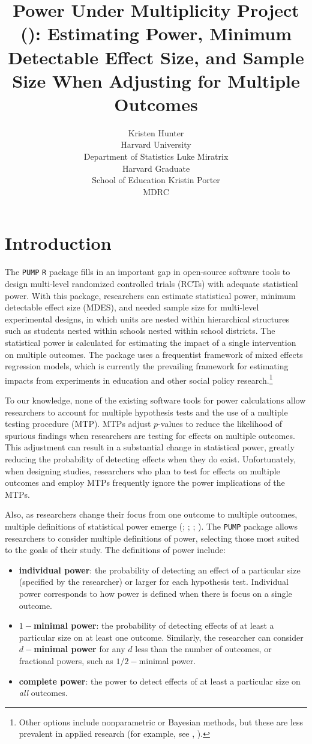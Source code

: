 \documentclass[
]{jss}
\author{
Kristen Hunter\\Harvard University\\
Department of Statistics \And Luke Miratrix\\Harvard Graduate\\
School of Education \And Kristin Porter\\MDRC
}
\title{Power Under Multiplicity Project (\pkg{PUMP}): Estimating Power,
Minimum Detectable Effect Size, and Sample Size When Adjusting for
Multiple Outcomes}
\providecommand{\tightlist}{%
  \setlength{\itemsep}{0pt}\setlength{\parskip}{0pt}}
\begin{document}
\section{Introduction}
\label{sec:intro}

The \texttt{PUMP} \texttt{R} package fills in an important gap in
open-source software tools to design multi-level randomized controlled
trials (RCTs) with adequate statistical power. With this package,
researchers can estimate statistical power, minimum detectable effect
size (MDES), and needed sample size for multi-level experimental
designs, in which units are nested within hierarchical structures such
as students nested within schools nested within school districts. The
statistical power is calculated for estimating the impact of a single
intervention on multiple outcomes. The package uses a frequentist
framework of mixed effects regression models, which is currently the
prevailing framework for estimating impacts from experiments in
education and other social policy research.\footnote{Other options
  include nonparametric or Bayesian methods, but these are less
  prevalent in applied research (for example, see
  \citet{GELMANETAL2012}, \citet{GelmanHill2007}).}

To our knowledge, none of the existing software tools for power
calculations allow researchers to account for multiple hypothesis tests
and the use of a multiple testing procedure (MTP). MTPs adjust
\(p\)-values to reduce the likelihood of spurious findings when
researchers are testing for effects on multiple outcomes. This
adjustment can result in a substantial change in statistical power,
greatly reducing the probability of detecting effects when they do
exist. Unfortunately, when designing studies, researchers who plan to
test for effects on multiple outcomes and employ MTPs frequently ignore
the power implications of the MTPs.

Also, as researchers change their focus from one outcome to multiple
outcomes, multiple definitions of statistical power emerge
(\citet{RN23882}; \citet{RN23878}; \citet{RN23881}; \citet{MTSAS}). The
\texttt{PUMP} package allows researchers to consider multiple
definitions of power, selecting those most suited to the goals of their
study. The definitions of power include:

\begin{itemize}
\tightlist
\item
  \textbf{individual power}: the probability of detecting an effect of a
  particular size (specified by the researcher) or larger for each
  hypothesis test. Individual power corresponds to how power is defined
  when there is focus on a single outcome.
\item
  \textbf{\(1-\)minimal power}: the probability of detecting effects of
  at least a particular size on at least one outcome. Similarly, the
  researcher can consider \textbf{\(d-\)minimal power} for any \(d\)
  less than the number of outcomes, or fractional powers, such as
  \(1/2-\)minimal power.
\item
  \textbf{complete power}: the power to detect effects of at least a
  particular size on \emph{all} outcomes.
\end{itemize}
\end{document}
